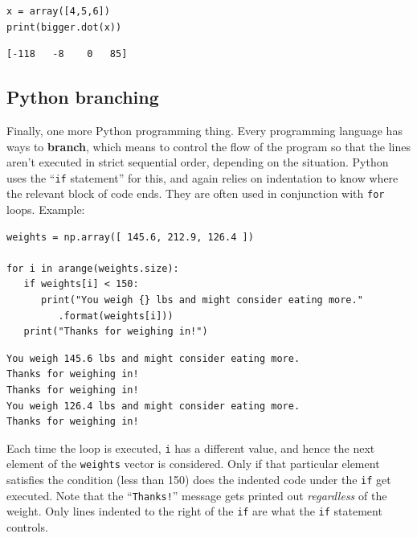 \begin{Verbatim}[fontsize=\small,samepage=true,frame=single,framesep=3mm]
x = array([4,5,6])
print(bigger.dot(x))
\end{Verbatim}
\vspace{-.2in}

\begin{Verbatim}[fontsize=\small,samepage=true,frame=leftline,framesep=5mm,framerule=1mm]
[-118   -8    0   85]
\end{Verbatim}


\subsection*{Python branching}


Finally, one more Python programming thing. Every programming language has ways
to \textbf{branch}, which means to control the flow of the program so that the
lines aren't executed in strict sequential order, depending on the situation.
Python uses the ``\texttt{if} statement'' for this, and again relies on
indentation to know where the relevant block of code ends. They are often used
in conjunction with \texttt{for} loops. Example:


\begin{Verbatim}[fontsize=\footnotesize,samepage=true,frame=single,framesep=3mm]
weights = np.array([ 145.6, 212.9, 126.4 ])

for i in arange(weights.size):
   if weights[i] < 150:
      print("You weigh {} lbs and might consider eating more."
         .format(weights[i]))
   print("Thanks for weighing in!")
\end{Verbatim}
\vspace{-.2in}

\begin{Verbatim}[fontsize=\small,samepage=true,frame=leftline,framesep=5mm,framerule=1mm]
You weigh 145.6 lbs and might consider eating more.
Thanks for weighing in!
Thanks for weighing in!
You weigh 126.4 lbs and might consider eating more.
Thanks for weighing in!
\end{Verbatim}

Each time the loop is executed, \texttt{i} has a different value, and hence the
next element of the \texttt{weights} vector is considered. Only if that
particular element satisfies the condition (less than 150) does the indented
code under the \texttt{if} get executed. Note that the ``\texttt{Thanks!}''
message gets printed out \textit{regardless} of the weight. Only lines indented
to the right of the \texttt{if} are what the \texttt{if} statement controls.

